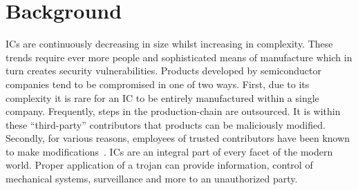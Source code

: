 \label{chapter:hardwareTrojans}

\newlength{\savedunitlength}
\setlength{\unitlength}{2em}
\section{Background} \label{sec:trojanBackGround}
\acrfull{ICs} are continuously decreasing in size whilst increasing in complexity.
These trends require ever more people and sophisticated means of manufacture which in turn creates security vulnerabilities.
Products developed by semiconductor companies tend to be compromised in one of two ways.
First, due to its complexity it is rare for an \acrshort{IC} to be entirely manufactured within a single company.
Frequently, steps in the production-chain are outsourced.
It is within these ``third-party'' contributors that products can be maliciously modified.
Secondly, for various reasons, employees of trusted contributors have been known to make modifications~\cite{trojanSurvey2014}.
\acrshort{IC}s are an integral part of every facet of the modern world.
Proper application of a trojan can provide information, control of mechanical systems, surveillance and more to an unauthorized party.



